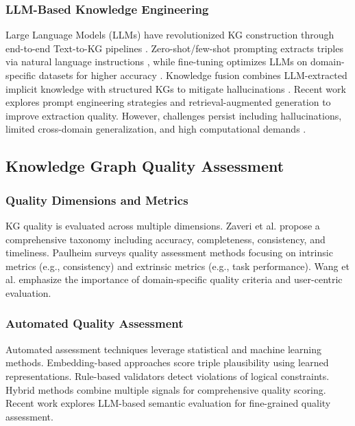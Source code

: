 \documentclass[runningheads]{llncs}
\begin{document}
\subsubsection{LLM-Based Knowledge Engineering}
Large Language Models (LLMs) have revolutionized KG construction through end-to-end Text-to-KG pipelines \cite{ref_zhang2023}. Zero-shot/few-shot prompting extracts triples via natural language instructions \cite{ref_wei2023}, while fine-tuning optimizes LLMs on domain-specific datasets for higher accuracy \cite{ref_pan2024}. Knowledge fusion combines LLM-extracted implicit knowledge with structured KGs to mitigate hallucinations \cite{ref_pan2023}. Recent work explores prompt engineering strategies \cite{ref_white2023} and retrieval-augmented generation \cite{ref_lewis2020} to improve extraction quality. However, challenges persist including hallucinations, limited cross-domain generalization, and high computational demands \cite{ref_ji2023}.

\subsection{Knowledge Graph Quality Assessment}

\subsubsection{Quality Dimensions and Metrics}
KG quality is evaluated across multiple dimensions. Zaveri et al. \cite{ref_zaveri2016} propose a comprehensive taxonomy including accuracy, completeness, consistency, and timeliness. Paulheim \cite{ref_paulheim2017} surveys quality assessment methods focusing on intrinsic metrics (e.g., consistency) and extrinsic metrics (e.g., task performance). Wang et al. \cite{ref_wang2021} emphasize the importance of domain-specific quality criteria and user-centric evaluation.

\subsubsection{Automated Quality Assessment}
Automated assessment techniques leverage statistical and machine learning methods. Embedding-based approaches \cite{ref_nickel2016} score triple plausibility using learned representations. Rule-based validators \cite{ref_kontokostas2014} detect violations of logical constraints. Hybrid methods \cite{ref_paulheim2014} combine multiple signals for comprehensive quality scoring. Recent work explores LLM-based semantic evaluation \cite{ref_lin2025} for fine-grained quality assessment.
\end{document}
